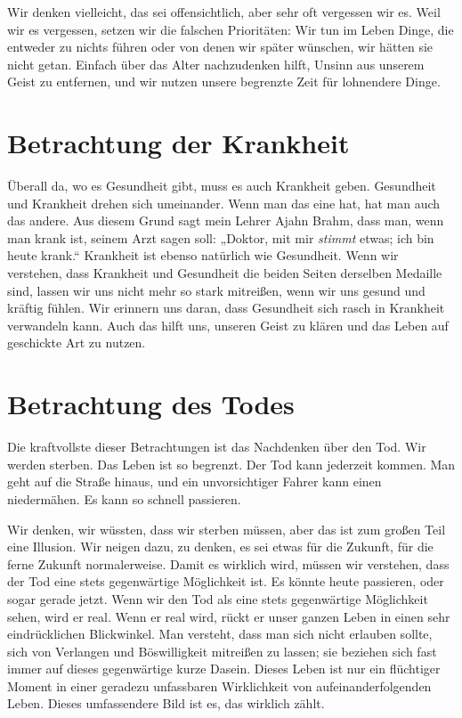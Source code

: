\documentclass[12pt,openany]{book}
\begin{document}
Wir denken vielleicht, das sei offensichtlich, aber sehr oft vergessen wir es. Weil wir es vergessen, setzen wir die falschen Prioritäten: Wir tun im Leben Dinge, die entweder zu nichts führen oder von denen wir später wünschen, wir hätten sie nicht getan. Einfach über das Alter nachzudenken hilft, Unsinn aus unserem Geist zu entfernen, und wir nutzen unsere begrenzte Zeit für lohnendere Dinge.

\section*{Betrachtung der Krankheit}

Überall da, wo es Gesundheit gibt, muss es auch Krankheit geben. Gesundheit und Krankheit drehen sich umeinander. Wenn man das eine hat, hat man auch das andere. Aus diesem Grund sagt mein Lehrer Ajahn Brahm, dass man, wenn man krank ist, seinem Arzt sagen soll: „Doktor, mit mir \textit{stimmt} etwas; ich bin heute krank.“ Krankheit ist ebenso natürlich wie Gesundheit. Wenn wir verstehen, dass Krankheit und Gesundheit die beiden Seiten derselben Medaille sind, lassen wir uns nicht mehr so stark mitreißen, wenn wir uns gesund und kräftig fühlen. Wir erinnern uns daran, dass Gesundheit sich rasch in Krankheit verwandeln kann. Auch das hilft uns, unseren Geist zu klären und das Leben auf geschickte Art zu nutzen.

\section*{Betrachtung des Todes}

Die kraftvollste dieser Betrachtungen ist das Nachdenken über den Tod. Wir werden sterben. Das Leben ist so begrenzt. Der Tod kann jederzeit kommen. Man geht auf die Straße hinaus, und ein unvorsichtiger Fahrer kann einen niedermähen. Es kann so schnell passieren.

Wir denken, wir wüssten, dass wir sterben müssen, aber das ist zum großen Teil eine Illusion. Wir neigen dazu, zu denken, es sei etwas für die Zukunft, für die ferne Zukunft normalerweise. Damit es wirklich wird, müssen wir verstehen, dass der Tod eine stets gegenwärtige Möglichkeit ist. Es könnte heute passieren, oder sogar gerade jetzt. Wenn wir den Tod als eine stets gegenwärtige Möglichkeit sehen, wird er real. Wenn er real wird, rückt er unser ganzen Leben in einen sehr eindrücklichen Blickwinkel. Man versteht, dass man sich nicht erlauben sollte, sich von Verlangen und Böswilligkeit mitreißen zu lassen; sie beziehen sich fast immer auf dieses gegenwärtige kurze Dasein. Dieses Leben ist nur ein flüchtiger Moment in einer geradezu unfassbaren Wirklichkeit von aufeinanderfolgenden Leben. Dieses umfassendere Bild ist es, das wirklich zählt.
\end{document}
